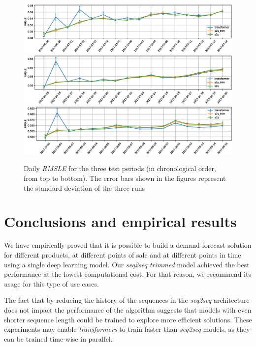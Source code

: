 \documentclass{elsarticle}
\begin{document}
\begin{figure}
	\centering
	\includegraphics[width=1\linewidth]{img/lag3_daily_error}
	\includegraphics[width=1\linewidth]{img/lag2_daily_error}
	\includegraphics[width=1\linewidth]{img/lag1_daily_error}
	\caption{Daily \textit{RMSLE} for the three test periods (in chronological order, from top to bottom). The error bars shown in the figures represent the standard deviation of the three runs }
	\label{fig:dailyerror}
\end{figure}



	\section{Conclusions and empirical results} \label{sec:conclusions}
	We have empirically proved that it is possible to build a demand forecast solution for different products, at different points of sale and at different points in time using a single deep learning model. Our \textit{seq2seq trimmed} model achieved the best performance at the lowest computational cost. For that reason, we recommend its usage for this type of use cases.
	
	The fact that by reducing the history of the sequences in the \textit{seq2seq} architecture does not impact the performance of the algorithm suggests that models with even shorter sequence length could be trained to explore more efficient solutions. These experiments may enable \textit{transformers} to train faster than \textit{seq2seq} models, as they can be trained time-wise in parallel.  
	
\end{document}
